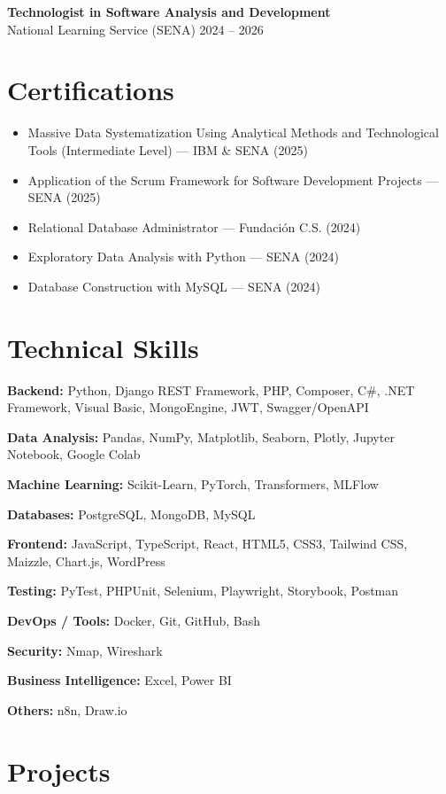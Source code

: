 \documentclass[11pt,a4paper]{article}
\begin{document}
\textbf{Technologist in Software Analysis and Development} \\
National Learning Service (SENA) \hfill 2024 -- 2026

\section*{Certifications}

\begin{itemize}
    \item Massive Data Systematization Using Analytical Methods and Technological Tools (Intermediate Level) — IBM \& SENA (2025)
    \item Application of the Scrum Framework for Software Development Projects — SENA (2025)
    \item Relational Database Administrator — Fundación C.S. (2024)
    \item Exploratory Data Analysis with Python — SENA (2024)
    \item Database Construction with MySQL — SENA (2024)
\end{itemize}

\section*{Technical Skills}

\textbf{Backend:}
Python, Django REST Framework, PHP, Composer, C\#, .NET Framework, Visual Basic, MongoEngine, JWT, Swagger/OpenAPI

\textbf{Data Analysis:}
Pandas, NumPy, Matplotlib, Seaborn, Plotly, Jupyter Notebook, Google Colab

\textbf{Machine Learning:}
Scikit-Learn, PyTorch, Transformers, MLFlow

\textbf{Databases:}
PostgreSQL, MongoDB, MySQL

\textbf{Frontend:}
JavaScript, TypeScript, React, HTML5, CSS3, Tailwind CSS, Maizzle, Chart.js, WordPress

\textbf{Testing:}
PyTest, PHPUnit, Selenium, Playwright, Storybook, Postman

\textbf{DevOps / Tools:}
Docker, Git, GitHub, Bash

\textbf{Security:}
Nmap, Wireshark

\textbf{Business Intelligence:}
Excel, Power BI

\textbf{Others:}
n8n, Draw.io

\section*{Projects}
\end{document}
